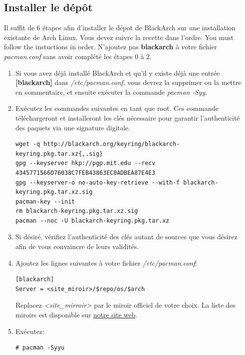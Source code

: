 \documentclass[a4paper, oneside, 11pt]{book}
\begin{document}
\subsection{Installer le dépôt}
Il suffit de 6 étapes afin d'installer le dépot de BlackArch sur une installation
existante de Arch Linux. Vous devez suivre la recette dans l'ordre.
You must follow the instuctions in order. N'ajoutez pas \textbf{blackarch} 
à votre fichier \textit{pacman.conf} sans avoir complété les étapes 0 à 2.
\begin{enumerate} \itemsep4pt
\item Si vous avez déjà installé BlackArch et qu'il y existe déjà une entrée
\textbf{[blackarch]} dans \textit{/etc/pacman.conf}, vous devrez la supprimer ou
la mettre en commentaire, et ensuite exécuter la commande \textit{pacman -Syy}.
\item Exécutez les commandes suivantes en tant que root. Ces commande
téléchargeront et installeront les clés nécessaire pour garantir l'authenticité
des paquets via une signature digitale.
{\small
\color{gray}
\begin{verbatim}
wget -q http://blackarch.org/keyring/blackarch-keyring.pkg.tar.xz{,.sig}
gpg --keyserver hkp://pgp.mit.edu --recv 4345771566D76038C7FEB43863EC0ADBEA87E4E3
gpg --keyserver-o no-auto-key-retrieve --with-f blackarch-keyring.pkg.tar.xz.sig
pacman-key --init
rm blackarch-keyring.pkg.tar.xz.sig
pacman --noc -U blackarch-keyring.pkg.tar.xz
\end{verbatim}
}
\item Si désiré, vérifiez l'authenticité des clés autant de sources que vous 
désirez afin de vous convaincre de leurs validités.
\item Ajoutez les lignes suivantes à votre fichier \textit{/etc/pacman.conf}:
{\small
\color{gray}
\begin{verbatim}
[blackarch]
Server = <site_miroir>/$repo/os/$arch
\end{verbatim}
}
Replacez \textit{\textless site\_mirroir\textgreater} par le miroir officiel
de votre choix. La liste des miroirs est disponible sur
\href{http://www.blackarch.org/}{notre site web}.

\item Exécutez:
{\small
\color{gray}
\begin{verbatim}
# pacman -Syyu
\end{verbatim}
}
\end{enumerate}
\end{document}
